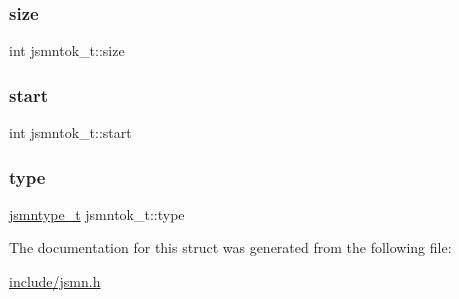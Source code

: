 \subsubsection{\texorpdfstring{size}{size}}
{\footnotesize\ttfamily int jsmntok\+\_\+t\+::size}

\mbox{\label{structjsmntok__t_a0a8f55d0095f268ce8e224fe1234acd0}} 
\subsubsection{\texorpdfstring{start}{start}}
{\footnotesize\ttfamily int jsmntok\+\_\+t\+::start}

\mbox{\label{structjsmntok__t_ac03dbd6b83cbcd979eb64702d5b9943e}} 
\subsubsection{\texorpdfstring{type}{type}}
{\footnotesize\ttfamily \hyperlink{include_2jsmn_8h_a065320719769f9dc1fbe30094e52802f}{jsmntype\+\_\+t} jsmntok\+\_\+t\+::type}



The documentation for this struct was generated from the following file\+:\begin{DoxyCompactItemize}
\item 
\hyperlink{include_2jsmn_8h}{include/jsmn.\+h}\end{DoxyCompactItemize}
